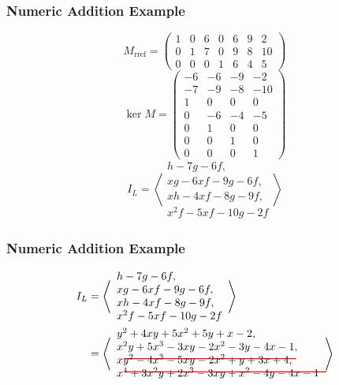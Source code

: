 \documentclass{beamer}
\newcommand{\pid}[1]{\left\langle #1 \right\rangle}
\newcommand\sout[2][black]{
  \setbox0=\hbox{$#2$}
  \rlap{
    \raisebox{.45\ht0}{
      \textcolor{#1}{
        \rule{\wd0}{1pt}
      }
    }
  }#2
}
\begin{document}
\begin{frame}[fragile]
\frametitle{Numeric Addition Example}
  \[ M_{\text{rref}} = \begin{pmatrix}
    1 & 0 & 6 & 0 & 6 & 9 & 2 \\
    0 & 1 & 7 & 0 & 9 & 8 & 10 \\
    0 & 0 & 0 & 1 & 6 & 4 & 5
  \end{pmatrix} \]
  \[ \ker M =
  \begin{pmatrix}
    -6 & -6 & -9 & -2 \\
    -7 & -9 & -8 & -10 \\
     1 &  0 &  0 &  0 \\
     0 & -6 & -4 & -5 \\
     0 &  1 &  0 &  0 \\
     0 &  0 &  1 &  0 \\
     0 &  0 &  0 &  1
  \end{pmatrix} \]
  \[ I_L = \pid{ \begin{array}{l}
      h - 7g - 6f, \\
      xg - 6xf - 9g - 6f, \\
      xh - 4xf - 8g - 9f, \\
      x^2f - 5xf - 10g - 2f \end{array} } \]
\end{frame}


\begin{frame}[fragile]
\frametitle{Numeric Addition Example}
  \begin{align*}
    I_L &=
      \pid{ \begin{array}{l}
        h - 7g - 6f, \\
        xg - 6xf - 9g - 6f, \\
        xh - 4xf - 8g - 9f, \\
        x^2f - 5xf - 10g - 2f
      \end{array} } \\
      &= \pid{ \begin{array}{l}
        y^2 + 4xy + 5x^2 + 5y + x - 2, \\
        x^2y + 5x^3 - 3xy - 2x^2 - 3y - 4x - 1, \\
        \sout[red]{xy^2 - 4x^3 - 5xy - 2x^2 + y + 3x + 4}, \\
        \sout[red]{x^4 + 3x^2y + 2x^3 - 3xy + x^2 - 4y - 4x - 1}
      \end{array} }
  \end{align*}
\end{frame}
\end{document}
